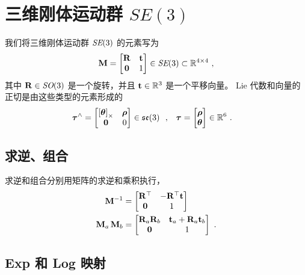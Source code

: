 

\section{三维刚体运动群 $SE(3)$}
\label{sec:SE3}


我们将三维刚体运动群 $\textit{SE}(3)$  的元素写为
%
\begin{align}
{\bf M}= \begin{bmatrix}
{\bf R} & {\bf t} \\ \bf0 & 1
\end{bmatrix} \in \textit{SE}(3) \subset {\mathbb R}^{4\times4}
~,
\end{align}
%
其中 ${\bf R}\in\textit{SO}(3)$ 是一个旋转，并且 ${\bf t}\in{\mathbb R}^3$ 是一个平移向量。
Lie 代数和向量的正切是由这些类型的元素形成的
%
\begin{align}
{\bm \tau}^\wedge
  &= \begin{bmatrix}\left[{{\bm \theta}}\right]_\times & {\bm \rho} \\ \bf0 & 0\end{bmatrix} \in {\mathfrak {se}}(3)
  ~~,
& 
{\bm \tau}
  &= \begin{bmatrix}{\bm \rho} \\ {{\bm \theta}}\end{bmatrix}\in{\mathbb R}^6 
~.
\end{align}
%


\subsection{求逆、组合}

求逆和组合分别用矩阵的求逆和乘积执行，
%
\begin{align}
{\bf M}^{-1} &= \begin{bmatrix}
{\bf R}^{\top} & -{\bf R}^{\top}{\bf t} \\ \bf0 & 1
\end{bmatrix} 
\\
{\bf M}_a\,{\bf M}_b &= \begin{bmatrix}
{\bf R}_a{\bf R}_b & {\bf t}_a+{\bf R}_a{\bf t}_b \\ \bf0 & 1
\end{bmatrix} 
~.
\end{align}



\subsection{Exp 和 Log 映射}

